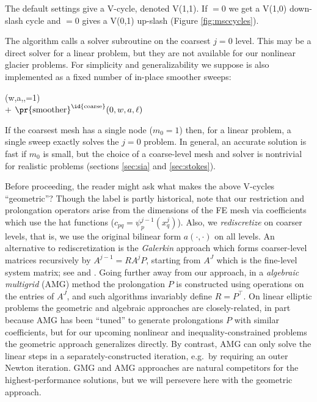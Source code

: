 \documentclass[letterpaper,final,12pt,reqno]{amsart}
\theoremstyle{claim}
\numberwithin{equation}{section}
\numberwithin{figure}{section}
\numberwithin{table}{section}
\numberwithin{theorem}{section}
\begin{document}
The default settings give a V-cycle, denoted V(1,1).  If  $=0$ we get a V(1,0) down-slash cycle and  $=0$ gives a V(0,1) up-slash (Figure \ref{fig:msccycles}).

The algorithm calls a solver subroutine on the coarsest $j=0$ level.  This may be a direct solver for a linear problem, but they are not available for our nonlinear glacier problems.  For simplicity and generalizability we suppose  is also implemented as a fixed number of in-place smoother sweeps:
\begin{pseudo*} \label{ps:gmg-coarsesolve}
(w,a,\ell,=1)\text{:} \\+
    $\text{\pr{smoother}}^{\text{\id{coarse}}}(0,w,a,\ell)$ \\
\end{pseudo*}
If the coarsest mesh has a single node ($m_0=1$) then, for a linear problem, a single sweep exactly solves the $j=0$ problem.  In general, an accurate solution is fast if $m_0$ is small, but the choice of a coarse-level mesh and solver is nontrivial for realistic problems (sections \ref{sec:sia} and \ref{sec:stokes}).

Before proceeding, the reader might ask what makes the above V-cycles ``geometric''?  Though the label is partly historical, note that our restriction and prolongation operators arise from the dimensions of the FE mesh via coefficients which use the hat functions ($c_{pq} = \psi_p^{j-1}(x_q^j)$).  Also, we \emph{rediscretize} on coarser levels, that is, we use the original bilinear form $a(\cdot,\cdot)$ on all levels.  An alternative to rediscretization is the \emph{Galerkin} approach which forms coarser-level matrices recursively by $A^{j-1} = R A^j P$, starting from $A^J$ which is the fine-level system matrix; see \cite[Chapter V]{Braess2007} and \cite[Chapter 6]{Bueler2021}.  Going further away from our approach, in a \emph{algebraic multigrid} (AMG) method \cite[Appendix A]{Trottenbergetal2001} the prolongation $P$ is constructed using operations on the entries of $A^J$, and such algorithms invariably define $R=P^\top$.  On linear elliptic problems the geometric and algebraic approaches are closely-related, in part because AMG has been ``tuned'' to generate prolongations $P$ with similar coefficients, but for our upcoming nonlinear and inequality-constrained problems the geometric approach generalizes directly.  By contrast, AMG can only solve the linear steps in a separately-constructed iteration, e.g.~by requiring an outer Newton iteration.  GMG and AMG approaches are natural competitors for the highest-performance solutions, but we will persevere here with the geometric approach.
\end{document}
